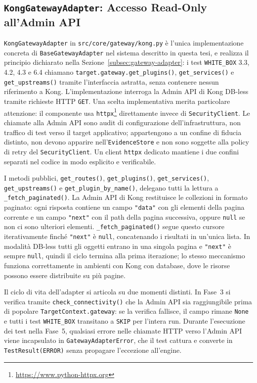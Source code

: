 \subsection{\texttt{KongGatewayAdapter}: Accesso Read-Only all'Admin API}\label{subsec:kong-adapter-impl}

\texttt{KongGatewayAdapter} in \texttt{src/core/gateway/kong.py} è l'unica implementazione concreta di \texttt{BaseGatewayAdapter} nel sistema descritto in questa tesi, e realizza il principio dichiarato nella Sezione~\ref{subsec:gateway-adapter}: i test \texttt{WHITE\_BOX} 3.3, 4.2, 4.3 e 6.4 chiamano \texttt{target.gateway.get\_plugins()}, \texttt{get\_services()} e \texttt{get\_upstreams()} tramite l'interfaccia astratta, senza contenere nessun riferimento a Kong. L'implementazione interroga la Admin \gls{API} di Kong DB-less tramite richieste \gls{HTTP} \texttt{GET}. Una scelta implementativa merita particolare attenzione: il componente usa \texttt{httpx}\footnote{\url{https://www.python-httpx.org}} direttamente invece di \texttt{SecurityClient}. Le chiamate alla Admin \gls{API} sono audit di configurazione dell'infrastruttura, non traffico di test verso il target applicativo; appartengono a un confine di fiducia distinto, non devono apparire nell'\texttt{EvidenceStore} e non sono soggette alla policy di retry del \texttt{SecurityClient}. Un client \texttt{httpx} dedicato mantiene i due confini separati nel codice in modo esplicito e verificabile.

I metodi pubblici, \texttt{get\_routes()}, \texttt{get\_plugins()}, \texttt{get\_services()}, \texttt{get\_upstreams()} e \texttt{get\_plugin\_by\_name()}, delegano tutti la lettura a \texttt{\_fetch\_paginated()}. La Admin \gls{API} di Kong restituisce le collezioni in formato paginato: ogni risposta contiene un campo \texttt{"data"} con gli elementi della pagina corrente e un campo \texttt{"next"} con il path della pagina successiva, oppure \texttt{null} se non ci sono ulteriori elementi. \texttt{\_fetch\_paginated()} segue questo cursore iterativamente finché \texttt{"next"} è \texttt{null}, concatenando i risultati in un'unica lista. In modalità DB-less tutti gli oggetti entrano in una singola pagina e \texttt{"next"} è sempre \texttt{null}, quindi il ciclo termina alla prima iterazione; lo stesso meccanismo funziona correttamente in ambienti con Kong con database, dove le risorse possono essere distribuite su più pagine.

Il ciclo di vita dell'adapter si articola su due momenti distinti. In Fase~3 si verifica tramite \texttt{check\_connectivity()} che la Admin \gls{API} sia raggiungibile prima di popolare \texttt{TargetContext.gateway}: se la verifica fallisce, il campo rimane \texttt{None} e tutti i test \texttt{WHITE\_BOX} transitano a \texttt{SKIP} per l'intera run. Durante l'esecuzione dei test nella Fase~5, qualsiasi errore nelle chiamate \gls{HTTP} verso l'Admin \gls{API} viene incapsulato in \texttt{GatewayAdapterError}, che il test cattura e converte in \texttt{TestResult(ERROR)} senza propagare l'eccezione all'engine.



